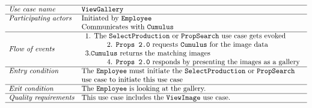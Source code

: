 \documentclass[12pt]{article}
\begin{document}
\\\\
\[
\begin{array}{ll}
\hline
\textit{Use case name} & \texttt{ViewGallery} \\
\hline
\textit{Participating actors} & \text{Initiated by \texttt{Employee}}\\ &
\text{Communicates with \texttt{Cumulus}}\\
\hline
\textit{Flow of events} & 
\begin{array}{l}
\text{1. The \texttt{SelectProduction} or \texttt{PropSearch} use case gets evoked}\\
\quad \quad \quad \text{2. \texttt{Props 2.0} requests \texttt{Cumulus} for the image data}\\
3.\text{\texttt{Cumulus} returns the matching images}\\
\quad \quad \quad \text{4. \texttt{Props 2.0} responds by presenting the images as a gallery}
\end{array} \\
\hline
\textit{Entry condition} &
\text{The \texttt{Employee} must initiate the \texttt{SelectProduction} or \texttt{PropSearch}}\\ &
\text{use case to initiate this use case}\\
\hline
\textit{Exit condition} & \text{The \texttt{Employee} is looking at the gallery.} \\
\hline
\textit{Quality requirements} & \text{This use case includes the \texttt{ViewImage} use case.} \\
\hline
\end{array}
\]
\\\\
\end{document}
